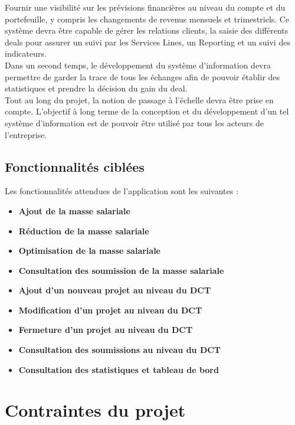 Fournir une visibilité sur les prévisions financières au niveau du compte et du portefeuille, y compris les changements de revenus mensuels et trimestriels. Ce système devra être capable de gérer les relations clients, la saisie des différents deals pour assurer un suivi par les Services Lines, un Reporting et un suivi des indicateurs.
\\

Dans un second temps, le développement du système d’information devra permettre de garder la trace de tous les échanges afin de pouvoir établir des statistiques et prendre la décision du gain du deal.
\\

Tout au long du projet, la notion de passage à l’échelle devra être prise en compte. L’objectif à long terme de la conception et du développement d’un tel système d’information est de pouvoir être utilisé par tous les acteurs de l’entreprise.

\subsection{Fonctionnalités ciblées}

Les fonctionnalités attendues de l'application sont les suivantes :
\\

\begin{itemize}
    \item \textbf{Ajout de la masse salariale}
    \item \textbf{Réduction de la masse salariale}
    \item \textbf{Optimisation de la masse salariale}
    \item \textbf{Consultation des soumission de la masse salariale}
    \item \textbf{Ajout d'un nouveau projet au niveau du DCT}
    \item \textbf{Modification d'un projet au niveau du DCT}
    \item \textbf{Fermeture d'un projet au niveau du DCT}
    \item \textbf{Consultation des soumissions au niveau du DCT}
    \item \textbf{Consultation des statistiques et tableau de bord}
\end{itemize}


\section{Contraintes du projet}

